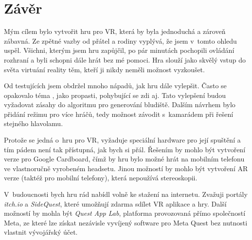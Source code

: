 \chapter*{Závěr}

Mým cílem bylo vytvořit hru pro VR, která by byla jednoduchá a zároveň zábavná. Ze zpětné vazby od přátel a rodiny vyplývá, že jsem v~tomto ohledu uspěl. Všichni, kterým jsem hru zapůjčil, po pár minutách pochopili ovládání rozhraní a byli schopni dále hrát bez mé pomoci. Hra slouží jako skvělý vstup do světa virtuání reality těm, kteří ji nikdy neměli možnost vyzkoušet.

Od testujících jsem obdržel mnoho nápadů, jak hru dále vylepšit. Často se opakovalo téma , jako propasti, pohybující se zdi aj. Tato vylepšení budou vyžadovat zásahy do algoritmu pro generování bludiště. Dalším návrhem bylo přidání režimu pro více hráčů, tedy možnost závodit s~kamarádem při řešení stejného hlavolamu.

Protože se jedná o~hru pro VR, vyžaduje speciální hardware pro její spuštění a tím pádem není tak přístupná, jak bych si přál. Řešením by mohlo být vytvoření verze pro Google Cardboard, čímž by hru bylo možné hrát na mobilním telefonu ve vlastnoručně vyrobeném headsetu. Jinou možností by mohlo být vytvoření AR verze (taktéž pro mobilní telefony), která nepoužívá stereoskopii.

V~budoucnosti bych hru rád nabídl volně ke stažení na internetu. Zvažuji portály \textit{itch.io} a \textit{SideQuest}, které umožňují zdarma sdílet VR aplikace a hry. Další možností by mohla být \textit{Quest App Lab}, platforma provozovaná přímo společností Meta, ze které lze získat nezávisle vyvíjený software pro Meta Quest bez nutnosti vlastnit vývojářský účet.